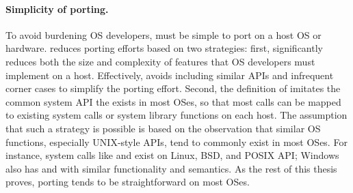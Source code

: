 \paragraph{Simplicity of porting.}
To avoid burdening OS developers,
\thehostabi{}
must be simple to port on a host OS or hardware.
\Thehostabi{} reduces porting efforts
based on two strategies:
first, \thehostabi{} significantly reduces both the size and complexity of features
that OS developers must implement on a host.
Effectively, \thehostabi{} avoids including similar APIs and infrequent corner cases
to simplify the porting effort.
Second, the definition of \thehostabi{}
imitates the common system API the exists in most OSes,
so that
most calls can be mapped to
existing system calls or system library functions
on each host.
The assumption that such a strategy is possible
is based on
the observation that
similar OS functions, especially UNIX-style APIs,
tend to commonly exist in most OSes.
For instance,
system calls like  and  exist on Linux, BSD, and POSIX API;
Windows also has  and 
with similar functionality and semantics.
As the rest of this thesis proves, porting \thehostabi{} tends to be straightforward
on most OSes.



